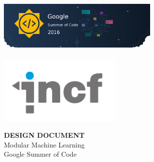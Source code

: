 \begin{titlepage}
    \newpage
    \thispagestyle{empty}
    \frenchspacing
    \hspace{-0.2cm}
    \includegraphics[width= 8.0cm,height=3.4cm]{google}
     \hspace{2.5cm}
     \includegraphics[height=3.4cm]{incf-logo}
    \hspace{0.2cm}
   

    \vspace*{3.2cm}\vfill
    \begin{center}
        \begin{minipage}[t]{\textwidth}
            \begin{center}
                \LARGE{\rm{\textbf{\uppercase{Design Document}}\\ Modular Machine Learning}}\\
                \Large{\rm{Google Summer of Code}}
            \end{center}
        \end{minipage}
    \end{center}
    \vfill
    \hfill{}
\end{titlepage}
